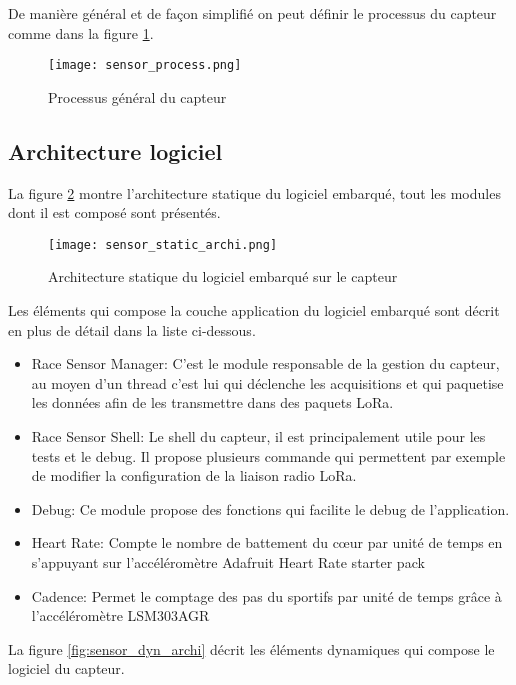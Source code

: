 De manière général et de façon simplifié on peut définir le processus du capteur comme dans la figure \ref{fig:sensor_process}.

\begin{figure}[htb]
\centering 
\texttt{[image: sensor\_process.png]} 
\caption{Processus général du capteur}
\label{fig:sensor_process}
\end{figure}

\subsection{Architecture logiciel}

La figure \ref{fig:sensor_static_archi} montre l'architecture statique du logiciel embarqué, tout les modules dont il est composé sont présentés.

\begin{figure}[htb]
\centering 
\texttt{[image: sensor\_static\_archi.png]} 
\caption{Architecture statique du logiciel embarqué sur le capteur}
\label{fig:sensor_static_archi}
\end{figure}

Les éléments qui compose la couche application du logiciel embarqué sont décrit en plus de détail dans la liste ci-dessous.

\begin{itemize}
\item Race Sensor Manager: C'est le module responsable de la gestion du capteur, au moyen d'un thread c'est lui qui déclenche les acquisitions et qui paquetise les données afin de les transmettre dans des paquets LoRa.
\item Race Sensor Shell: Le shell du capteur, il est principalement utile pour les tests et le debug. Il propose plusieurs commande qui permettent par exemple de modifier la configuration de la liaison radio LoRa.
\item Debug: Ce module propose des fonctions qui facilite le debug de l'application.
\item Heart Rate: Compte le nombre de battement du cœur par unité de temps en s'appuyant sur l'accéléromètre Adafruit Heart Rate starter pack
\item Cadence: Permet le comptage des pas du sportifs par unité de temps grâce à l'accéléromètre LSM303AGR
\end{itemize}

La figure \ref{fig:sensor_dyn_archi} décrit les éléments dynamiques qui compose le logiciel du capteur.

